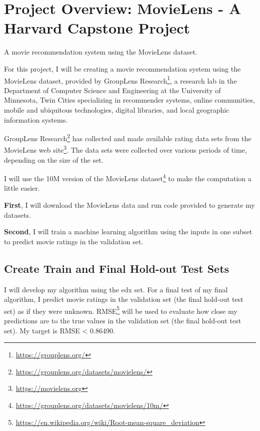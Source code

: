 \documentclass[
]{article}
\DeclareRobustCommand{\href}[2]{#2\footnote{\url{#1}}}
\begin{document}
\renewcommand{\listequationsname}{}

\listofequations
\clearpage

\newpage


\hypertarget{project-overview-movielens---a-harvard-capstone-project}{%
\section{Project Overview: MovieLens - A Harvard Capstone
Project}\label{project-overview-movielens---a-harvard-capstone-project}}

A movie recommendation system using the MovieLens dataset.

For this project, I will be creating a movie recommendation system using
the MovieLens dataset, provided by
\href{https://grouplens.org/}{GroupLens Research}, a research lab in the
Department of Computer Science and Engineering at the University of
Minnesota, Twin Cities specializing in recommender systems, online
communities, mobile and ubiquitous technologies, digital libraries, and
local geographic information systems.

\href{https://grouplens.org/datasets/movielens/}{GroupLens Research} has
collected and made available rating data sets from the
\href{https://movielens.org}{MovieLens web site}. The data sets were
collected over various periods of time, depending on the size of the
set.

I will use the \href{https://grouplens.org/datasets/movielens/10m/}{10M
version of the MovieLens dataset} to make the computation a little
easier.

\textbf{First}, I will download the MovieLens data and run code provided
to generate my datasets.

\textbf{Second}, I will train a machine learning algorithm using the
inputs in one subset to predict movie ratings in the validation set.

\hypertarget{create-train-and-final-hold-out-test-sets}{%
\subsection{Create Train and Final Hold-out Test
Sets}\label{create-train-and-final-hold-out-test-sets}}

I will develop my algorithm using the edx set. For a final test of my
final algorithm, I predict movie ratings in the validation set (the
final hold-out test set) as if they were unknown.
\href{https://en.wikipedia.org/wiki/Root-mean-square_deviation}{RMSE}
will be used to evaluate how close my predictions are to the true values
in the validation set (the final hold-out test set). My target is RMSE
\textless{} 0.86490.
\end{document}
